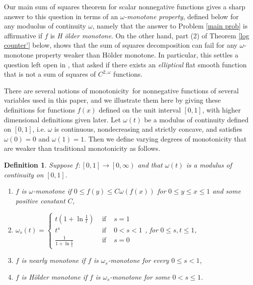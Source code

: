 \documentclass{amsart}
\theoremstyle{plain}
\newtheorem{definition}[theorem]{Definition}
\numberwithin{equation}{section}
\begin{document}
Our main sum of squares theorem for scalar nonnegative functions gives a
sharp answer to this question in terms of an $\omega $\emph{-monotone
property}, defined below for any moduolus of continuity $\omega $, namely
that the answer to Problem \ref{main prob} is affirmative if $f$ is \emph{H%
\"{o}lder monotone}. On the other hand, part (2) of Theorem \ref{log
counter'} below, shows that the sum of squares decomposition can fail for
any $\omega $-monotone property weaker than H\"{o}lder monotone. In
particular, this settles a question left open in \cite[Remark 1.4 on page 141%
]{BoBrCoPe}, that asked if there exists an \emph{elliptical} flat smooth
function that is not a sum of squares of $C^{2,\omega }$ functions.

There are several notions of monotonicity\ for nonnegative functions of
several variables used in this paper, and we illustrate them here by giving
these definitions for functions $f\left( x\right) $ defined on the unit
interval $\left[ 0,1\right] $, with higher dimensional definitions given
later. Let $\omega \left( t\right) $ be a modulus of continuity defined on $%
\left[ 0,1\right] $, i.e. $\omega $ is continuous, nondecreasing and
strictly concave, and satisfies $\omega \left( 0\right) =0$ and $\omega
\left( 1\right) =1$. Then we define varying degrees of monotonicity that are
weaker than traditional monotonicity as follows.

\begin{definition}
\label{weakly}Suppose $f:\left[ 0,1\right] \rightarrow \left[ 0,\infty
\right) $ and that $\omega \left( t\right) $ is a modulus of continuity on $%
\left[ 0,1\right] $.

\begin{enumerate}
\item $f$ is $\omega $\emph{-monotone} if $0\leq f\left( y\right) \leq
C\omega \left( f\left( x\right) \right) $ for $0\leq y\leq x\leq 1$ and some
positive constant $C$,

\item $\omega _{s}\left( t\right) =\left\{ 
\begin{array}{ccc}
t\left( 1+\ln \frac{1}{t}\right) & \text{ if } & s=1 \\ 
t^{s} & \text{ if } & 0<s<1 \\ 
\frac{1}{1+\ln \frac{1}{t}} & \text{ if } & s=0%
\end{array}%
\right. $, for $0\leq s,t\leq 1$,

\item $f$ is \emph{nearly monotone} if $f$ is $\omega _{s}$-monotone for
every $0\leq s<1$,

\item $f$ is \emph{H\"{o}lder monotone} if $f$ is $\omega _{s}$-monotone for
some $0<s\leq 1$.
\end{enumerate}
\end{definition}
\end{document}
